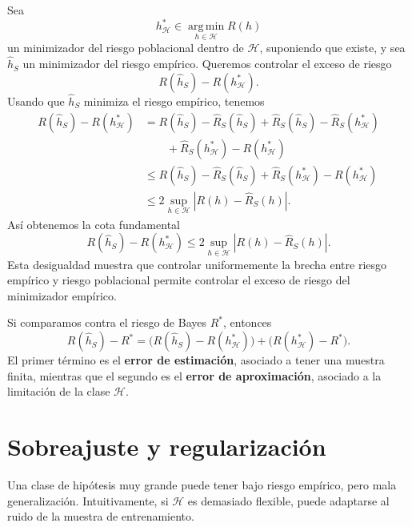 \documentclass[11pt]{report}
\theoremstyle{definition}
\theoremstyle{plain}
\numberwithin{equation}{section}
\begin{document}
Sea
\begin{equation*}
    h_{\mathcal{H}}^*
    \in
    \operatorname*{arg\,min}_{h\in\mathcal{H}}R(h)
\end{equation*}
un minimizador del riesgo poblacional dentro de \(\mathcal{H}\), suponiendo que existe, y sea \(\widehat{h}_S\) un minimizador del riesgo empírico. Queremos controlar el exceso de riesgo
\begin{equation*}
    R(\widehat{h}_S)-R(h_{\mathcal{H}}^*).
\end{equation*}
Usando que \(\widehat{h}_S\) minimiza el riesgo empírico, tenemos
\begin{align*}
    R(\widehat{h}_S)-R(h_{\mathcal{H}}^*)
    &=
    R(\widehat{h}_S)-\widehat{R}_S(\widehat{h}_S)
    +
    \widehat{R}_S(\widehat{h}_S)-\widehat{R}_S(h_{\mathcal{H}}^*)\\
    &\qquad
    +
    \widehat{R}_S(h_{\mathcal{H}}^*)-R(h_{\mathcal{H}}^*)\\
    &\leq
    R(\widehat{h}_S)-\widehat{R}_S(\widehat{h}_S)
    +
    \widehat{R}_S(h_{\mathcal{H}}^*)-R(h_{\mathcal{H}}^*)\\
    &\leq
    2\sup_{h\in\mathcal{H}}
    |R(h)-\widehat{R}_S(h)|.
\end{align*}
Así obtenemos la cota fundamental
\begin{equation*}
    R(\widehat{h}_S)-R(h_{\mathcal{H}}^*)
    \leq
    2\sup_{h\in\mathcal{H}}
    |R(h)-\widehat{R}_S(h)|.
\end{equation*}
Esta desigualdad muestra que controlar uniformemente la brecha entre riesgo empírico y riesgo poblacional permite controlar el exceso de riesgo del minimizador empírico.

Si comparamos contra el riesgo de Bayes \(R^*\), entonces
\begin{equation*}
    R(\widehat{h}_S)-R^*
    =
    \bigl(R(\widehat{h}_S)-R(h_{\mathcal{H}}^*)\bigr)
    +
    \bigl(R(h_{\mathcal{H}}^*)-R^*\bigr).
\end{equation*}
El primer término es el \textbf{error de estimación}, asociado a tener una muestra finita, mientras que el segundo es el \textbf{error de aproximación}, asociado a la limitación de la clase \(\mathcal{H}\).

\section{Sobreajuste y regularización}

Una clase de hipótesis muy grande puede tener bajo riesgo empírico, pero mala generalización. Intuitivamente, si \(\mathcal{H}\) es demasiado flexible, puede adaptarse al ruido de la muestra de entrenamiento.
\end{document}
